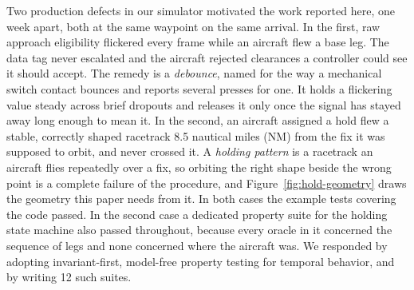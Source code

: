 \documentclass[12pt]{article}
\begin{document}
Two production defects in our simulator motivated the work reported here, one
week apart, both at the same waypoint on the same arrival. In the first, raw
approach eligibility flickered every frame while an aircraft flew a base leg. The
data tag never escalated and the aircraft rejected clearances a controller could
see it should accept. The remedy is a \emph{debounce}, named for the way a
mechanical switch contact bounces and reports several presses for one. It holds a
flickering value steady across brief dropouts and releases it only once the signal
has stayed away long enough to mean it. In the second, an aircraft assigned a hold flew a stable,
correctly shaped racetrack 8.5 nautical miles (NM) from the fix it was
supposed to orbit, and never crossed it. A \emph{holding pattern} is a racetrack an
aircraft flies repeatedly over a fix, so orbiting the right shape beside the
wrong point is a complete failure of the procedure, and
Figure~\ref{fig:hold-geometry} draws the geometry this paper needs from it. In
both cases the example tests covering the code passed. In the second case a
dedicated property suite for the holding state machine also passed throughout,
because every oracle in it concerned the sequence of legs and none concerned
where the aircraft was. We responded by adopting invariant-first, model-free
property testing for temporal behavior, and by writing 12 such suites.
\end{document}
